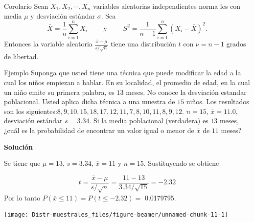 \documentclass[
  10pt,
  ignorenonframetext,
]{beamer}
\begin{document}
\begin{frame}{}
\protect\hypertarget{section-30}{}
\begin{block}{Corolario}
\protect\hypertarget{corolario}{}
Sean \(X_1, X_2,\cdots, X_n\) variables aleatorias independientes norma
les con media \(\mu\) y desviación estándar \(\sigma\). Sea
\[\bar{X}=\frac{1}{n}\sum_{i=1}^n X_i \qquad\mbox{ y } \qquad S^2=\frac{1}{n-1}\sum_{i=1}^n (X_i-\bar{X})^2.\]
Entonces la variable aleatoria \(\frac{\bar{x}-\mu}{s/\sqrt{n}}\) tiene
una distribución \(t\) con \(\nu=n-1\) grados de libertad.
\end{block}
\end{frame}

\begin{frame}{}
\protect\hypertarget{section-31}{}
\begin{block}{Ejemplo}
\protect\hypertarget{ejemplo-1}{}
Suponga que usted tiene una técnica que puede modificar la edad a la
cual los niños empiezan a hablar. En su localidad, el promedio de edad,
en la cual un niño emite su primera palabra, es \(13\) meses. No conoce
la desviación estandar poblacional. Usted aplica dicha técnica a una
muestra de \(15\) niños. Los resultados son los
siguientes:\(8, 9, 10, 15, 18, 17, 12, 11, 7, 8, 10, 11, 8, 9, 12\).
\(n = 15\), \(\bar{x} = 11.0\), desviación estándar \(s = 3.34\). Si la
media poblacional (verdadera) es \(13\) meses, ¿cuál es la probabilidad
de encontrar un valor igual o menor de \(\bar{x}\) de \(11\) meses?

\textbf{Solución}

Se tiene que \(\mu =13\), \(s=3.34\), \(\bar{x}=11\) y \(n=15\).
Sustituyendo se obtiene

\[t=\frac{\bar{x}-\mu}{s/\sqrt{n}}=\frac{11-13}{3.34/\sqrt{15}}=-2.32\]
Por lo tanto \(P(\bar{x}\le 11)=P(t \le -2.32) =\) 0.0179795.
\end{block}
\end{frame}

\begin{frame}{}
\protect\hypertarget{section-32}{}
\begin{center}\texttt{[image: Distr-muestrales\_files/figure-beamer/unnamed-chunk-11-1]} \end{center}
\end{frame}
\end{document}
